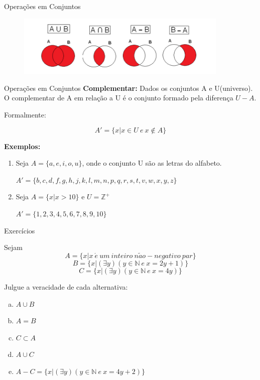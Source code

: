 \documentclass[aspectratio=169]{beamer}
\begin{document}
\begin{frame}{Operações em Conjuntos}
\begin{figure}
    \includegraphics[width=0.9\textwidth]{./figs/operacoes.png}
\end{figure}
\end{frame}

\begin{frame}{Operações em Conjuntos}
    \textbf{Complementar: } Dados os conjuntos A e U(universo). O complementar de A em relação a U é o conjunto formado pela diferença $U - A$.

    \vspace{4mm}
    Formalmente:

    \[  A' = \{ x | x \in U ~ e ~ x \notin A \} \]

    \textbf{Exemplos:}

    \begin{enumerate}
        \item Seja $A = \{a, e, i, o, u\}$, onde o conjunto U são as letras do alfabeto.
    
        $A' = \{b, c, d, f, g, h, j, k, l, m, n, p, q, r, s, t, v, w, x, y, z\}$
    
        \item Seja $A = \{ x | x > 10\} $ e $U = \mathbb{Z}^+$
        
        $A' = \{1,2,3,4,5,6,7,8,9,10 \}$
    \end{enumerate}

\end{frame}

\begin{frame}{Exercícios}

    Sejam
\[ A = \{x | x ~ \acute{e} ~ um ~ inteiro ~ n\tilde{a}o - negativo ~ par \} \]
\[ B = \{x | (\exists y) (y \in \mathbb{N} ~ e ~ x = 2y + 1 )\} \]
\[ C = \{x|(\exists y)(y \in \mathbb{N} ~ e ~ x = 4y)\} \]

Julgue a veracidade de cada alternativa:

\begin{enumerate}[a)]
    \item $A \cup B$
    \item $A = B$
    \item $ C \subset A$
    \item $A \cup C$
    \item $A - C = \{x|(\exists y)(y \in \mathbb{N} ~ e ~ x = 4y + 2)\}$
\end{enumerate}
\end{frame}
\end{document}
